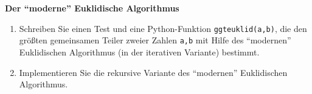 \textbf{Der ``moderne'' Euklidische Algorithmus}
\begin{enumerate}
	\item Schreiben Sie einen Test und eine Python-Funktion \verb|ggteuklid(a,b)|, die den größten gemeinsamen Teiler zweier Zahlen \verb|a,b| mit Hilfe des ``modernen'' Euklidischen Algorithmus (in der iterativen Variante) bestimmt.
	\item Implementieren Sie die rekursive Variante des ``modernen'' Euklidischen Algorithmus.
\end{enumerate}